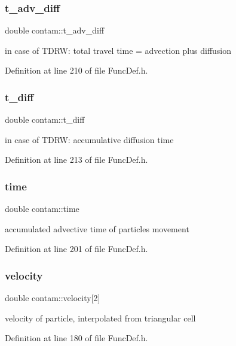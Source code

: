 \subsubsection{\texorpdfstring{t\_adv\_diff}{t\_adv\_diff}}
{\footnotesize\ttfamily double contam\+::t\+\_\+adv\+\_\+diff}

in case of T\+D\+RW\+: total travel time = advection plus diffusion 

Definition at line 210 of file Func\+Def.\+h.

\mbox{\label{structcontam_aaff43bc31b910d7ac48f5d0a78f2212b}} 
\subsubsection{\texorpdfstring{t\_diff}{t\_diff}}
{\footnotesize\ttfamily double contam\+::t\+\_\+diff}

in case of T\+D\+RW\+: accumulative diffusion time 

Definition at line 213 of file Func\+Def.\+h.

\mbox{\label{structcontam_a11c5e87e6e62d258648d5a02472251d5}} 
\subsubsection{\texorpdfstring{time}{time}}
{\footnotesize\ttfamily double contam\+::time}

accumulated advective time of particles movement 

Definition at line 201 of file Func\+Def.\+h.

\mbox{\label{structcontam_a70e44829116675e21bda7422f0c2b777}} 
\subsubsection{\texorpdfstring{velocity}{velocity}}
{\footnotesize\ttfamily double contam\+::velocity\mbox{[}2\mbox{]}}

velocity of particle, interpolated from triangular cell 

Definition at line 180 of file Func\+Def.\+h.

\mbox{\label{structcontam_a5b317ab55ab5b48dc82c9a473c76a41e}} 
